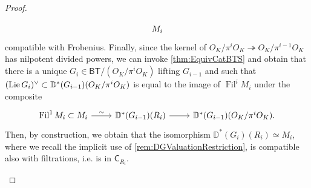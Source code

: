 \begin{proof}
\begin{enumerate}
\begin{equation*}
\begin{tikzcd}
	M_{i}
	\end{tikzcd}
	\end{equation*}
	compatible with Frobenius.
	Finally, since the kernel of $O_K/ \pi^i O_K \twoheadrightarrow O_K/ \pi^{ i-1 }O_K$
	has nilpotent divided powers,
	we can invoke \cref{thm:EquivCatBTS} and obtain that
	there is a unique $G_i \in \mathsf{BT}/ (O_K/\pi^iO_K)$
	lifting $G_{i-1}$ and such that $(\operatorname{Lie} G_i)^\vee \subset \mathbb{D}^*(G_{i-1})(O_K/\pi^i O_K)$
	is equal to the image of $\operatorname{Fil}^i M_i$ under the composite
	\begin{equation*}
	\begin{tikzcd}
		\operatorname{Fil}^1 M_i \subset M_i
		\arrow[r, "\sim", rightarrow] &
		\mathbb{D}^*(G_{i-1})(R_i)
		\arrow[r, "", rightarrow] &
		\mathbb{D}^*(G_{i-1})(O_K/\pi^iO_K)
	.\end{tikzcd}
	\end{equation*}
	Then, by construction, we obtain that the isomorphism
	$\mathbb{D}^*(G_i)(R_i) \simeq M_i$, where we recall the implicit use of 
	\cref{rem:DGValuationRestriction}, is compatible also with filtrations,
	i.e. is in $\mathsf{C}_{R_i}$.


\end{enumerate}
\end{proof}
